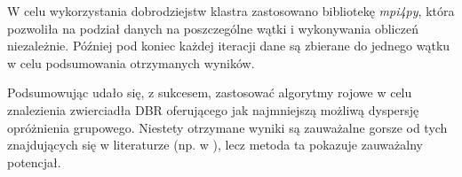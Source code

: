 W celu wykorzystania dobrodziejstw klastra zastosowano bibliotekę \textit{mpi4py}, która pozwoliła na podział danych na poszczególne wątki i wykonywania obliczeń niezależnie. Później pod koniec każdej iteracji dane są zbierane do jednego wątku w celu podsumowania otrzymanych wyników.

Podsumowując udało się, z sukcesem, zastosować algorytmy rojowe w celu znalezienia zwierciadła DBR oferującego jak najmniejszą możliwą dyspersję opróżnienia grupowego. Niestety otrzymane wyniki są zauważalne gorsze od tych znajdujących się w literaturze (np. w \cite{dbr2}), lecz metoda ta pokazuje zauważalny potencjał. 